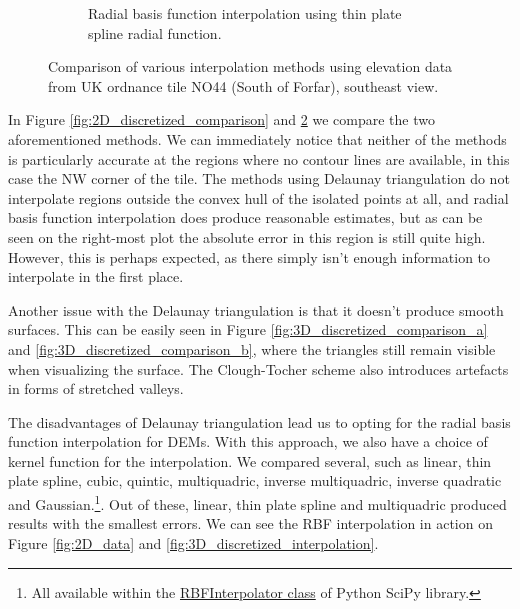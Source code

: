 \documentclass[a4paper,10pt]{report}
\begin{document}
\begin{figure}[H]
\begin{subfigure}{.32\textwidth}
    \caption{Radial basis function interpolation using thin plate spline radial function.}
    \label{fig:3D_discretized_comparison_c}
    \end{subfigure}
    \caption{Comparison of various interpolation methods using elevation data from UK ordnance tile NO44 (South of Forfar), southeast view.}
    \label{fig:3D_discretized_comparison}
\end{figure}

In Figure \ref{fig:2D_discretized_comparison} and \ref{fig:3D_discretized_comparison} we compare the two aforementioned methods. We can immediately notice that neither of the methods is particularly accurate at the regions where no contour lines are available, in this case the NW corner of the tile. The methods using Delaunay triangulation do not interpolate regions outside the convex hull of the isolated points at all, and radial basis function interpolation does produce reasonable estimates, but as can be seen on the right-most plot the absolute error in this region is still quite high. However, this is perhaps expected, as there simply isn't enough information to interpolate in the first place.

Another issue with the Delaunay triangulation is that it doesn't produce smooth surfaces. This can be easily seen in Figure \ref{fig:3D_discretized_comparison_a} and \ref{fig:3D_discretized_comparison_b}, where the triangles still remain visible when visualizing the surface. The Clough-Tocher scheme also introduces artefacts in forms of stretched valleys.

The disadvantages of Delaunay triangulation lead us to opting for the radial basis function interpolation for DEMs. With this approach, we also have a choice of kernel function for the interpolation. We compared several, such as linear, thin plate spline, cubic, quintic, multiquadric, inverse multiquadric, inverse quadratic and Gaussian.\footnote{All available within the \href{https://docs.scipy.org/doc/scipy/reference/generated/scipy.interpolate.RBFInterpolator.html}{RBFInterpolator class} of Python SciPy library.}. Out of these, linear, thin plate spline and multiquadric produced results with the smallest errors. We can see the RBF interpolation in action on Figure \ref{fig:2D_data} and \ref{fig:3D_discretized_interpolation}.
\end{document}
